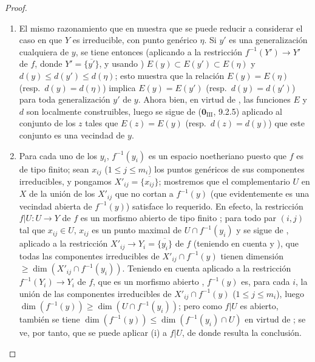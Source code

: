 \begin{proof}
\begin{enumerate}[label=(\roman*)]
  \item El mismo razonamiento que en  muestra que se puede reducir a considerar el caso en que $Y$ es irreducible, con punto genérico $\eta$.
  Si $y'$ es una generalización cualquiera de $y$, se tiene entonces (aplicando  a la restricción $f^{-1}(Y')\to Y'$ de $f$, donde $Y'=\overline{\{y'\}}$, y usando ) $E(y)\subset E(y')\subset E(\eta)$ y $d(y)\leq d(y')\leq d(\eta)$; esto muestra que la relación $E(y)=E(\eta)$ (resp.\ $d(y)=d(\eta)$) implica $E(y)=E(y')$ (resp.\ $d(y)=d(y')$) para toda generalización $y'$ de $y$.
  Ahora bien, en virtud de , las funciones $E$ y $d$ son localmente construibles, luego se sigue de ($\mathbf{0}_{\mathrm{III}}$, 9.2.5) aplicado al conjunto de los $z$ tales que $E(z)=E(y)$ (resp.\ $d(z)=d(y)$) que este conjunto es una vecindad de $y$.

  \item Para cada uno de los $y_i$, $f^{-1}(y_i)$ es un espacio noetheriano puesto que $f$ es de tipo finito; sean $x_{ij}$ ($1\leq j\leq m_i$) los puntos genéricos de sus componentes irreducibles, y pongamos $X'_{ij}=\overline{\{x_{ij}\}}$; mostremos que el complementario $U$ en $X$ de la unión de los $X'_{ij}$ que no cortan a $f^{-1}(y)$ (que evidentemente es una vecindad abierta de $f^{-1}(y)$) satisface lo requerido.
  En efecto, la restricción $f|U:U\to Y$ de $f$ es un morfismo abierto de tipo finito ; para todo par $(i,j)$ tal que $x_{ij}\in U$, $x_{ij}$ es un punto maximal de $U\cap f^{-1}(y_i)$ y se sigue de , aplicado a la restricción $X'_{ij}\to Y_i=\overline{\{y_i\}}$ de $f$ (teniendo en cuenta  y ), que todas las componentes irreducibles de $X'_{ij}\cap f^{-1}(y)$ tienen dimensión $\geq\dim(X'_{ij}\cap f^{-1}(y_i))$.
  Teniendo en cuenta  aplicado a la restricción $f^{-1}(Y_i)\to Y_i$ de $f$, que es un morfismo abierto , $f^{-1}(y)$ es, para cada $i$, la unión de las componentes irreducibles de $X'_{ij}\cap f^{-1}(y)$ ($1\leq j\leq m_i$), luego $\dim(f^{-1}(y))\geq\dim(U\cap f^{-1}(y_i))$; pero como $f|U$ es abierto, también se tiene $\dim(f^{-1}(y))\leq\dim(f^{-1}(y_i)\cap U)$ en virtud de ; se ve, por tanto, que se puede aplicar (i) a $f|U$, de donde resulta la conclusión.
\end{enumerate}
\end{proof}

